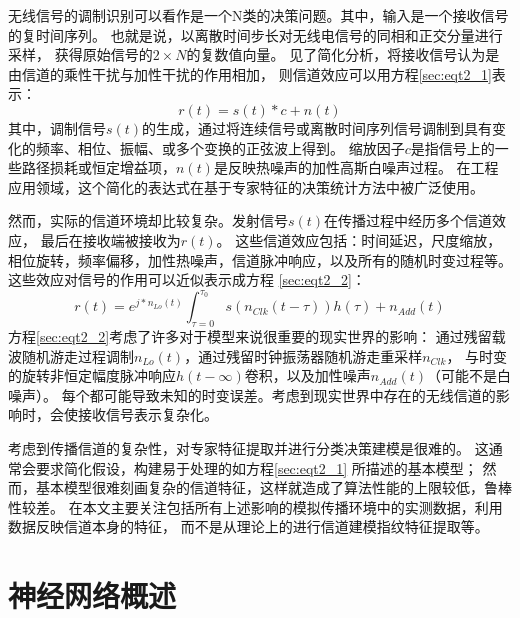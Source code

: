 无线信号的调制识别可以看作是一个N类的决策问题。其中，输入是一个接收信号的复时间序列。
也就是说，以离散时间步长对无线电信号的同相和正交分量进行采样，
获得原始信号的$2 \times N$的复数值向量。
见了简化分析，将接收信号认为是由信道的乘性干扰与加性干扰的作用相加，
则信道效应可以用方程\eqref{sec:eqt2_1}表示：
\begin{equation}\label{sec:eqt2_1}
r(t) = s(t)*c + n(t)
\end{equation}
其中，调制信号$s(t)$的生成，通过将连续信号或离散时间序列信号调制到具有变化的频率、相位、振幅、或多个变换的正弦波上得到。
缩放因子$c$是指信号上的一些路径损耗或恒定增益项，$n(t)$是反映热噪声的加性高斯白噪声过程。
在工程应用领域，这个简化的表达式在基于专家特征的决策统计方法中被广泛使用。\par

然而，实际的信道环境却比较复杂。发射信号$s(t)$在传播过程中经历多个信道效应， 最后在接收端被接收为$r(t)$。
这些信道效应包括：时间延迟，尺度缩放，相位旋转，频率偏移，加性热噪声，信道脉冲响应，以及所有的随机时变过程等。 
这些效应对信号的作用可以近似表示成方程 \eqref{sec:eqt2_2}：
\begin{equation}\label{sec:eqt2_2}
r(t) = e^{j*n_{Lo}(t)} \int_{\tau=0}^{\tau_{0}} s(n_{Clk}(t-\tau))h(\tau) + n_{Add}(t)
\end{equation}
方程\eqref{sec:eqt2_2}考虑了许多对于模型来说很重要的现实世界的影响：
通过残留载波随机游走过程调制$n_{Lo}(t)$，通过残留时钟振荡器随机游走重采样$n_{Clk}$，
与时变的旋转非恒定幅度脉冲响应$h(t-∞)$卷积，以及加性噪声$n_{Add}(t)$（可能不是白噪声）。
每个都可能导致未知的时变误差。考虑到现实世界中存在的无线信道的影响时，会使接收信号表示复杂化。\par

考虑到传播信道的复杂性，对专家特征提取并进行分类决策建模是很难的。
这通常会要求简化假设，构建易于处理的如方程\eqref{sec:eqt2_1} 所描述的基本模型；
然而，基本模型很难刻画复杂的信道特征，这样就造成了算法性能的上限较低，鲁棒性较差。
在本文主要关注包括所有上述影响的模拟传播环境中的实测数据，利用数据反映信道本身的特征，
而不是从理论上的进行信道建模指纹特征提取等。\par

\section{神经网络概述}

